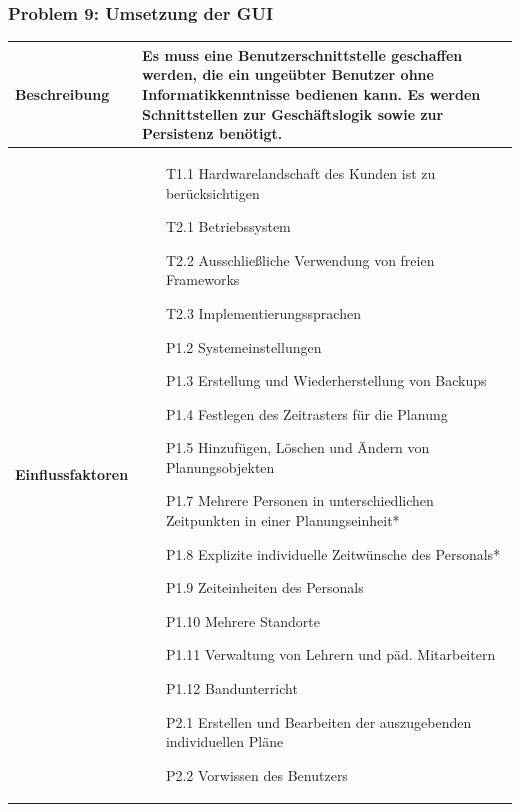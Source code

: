\documentclass[fontsize=12pt,paper=a4,twoside]{scrartcl}
\begin{document}
\subsubsection{Problem 9: Umsetzung der GUI}
\begin{tabularx}{\textwidth}{|p{6cm}|X|}
 \hline
 \textbf{Beschreibung} & 
Es muss eine Benutzerschnittstelle geschaffen werden, die ein ungeübter Benutzer ohne Informatikkenntnisse bedienen kann. Es werden Schnittstellen zur Geschäftslogik sowie zur Persistenz benötigt. \\\hline
 \textbf{Einflussfaktoren} &
 \begin{itemize}[topsep = 0pt]
\item[T1.1] Hardwarelandschaft des Kunden ist zu berücksichtigen
\item[T2.1] Betriebssystem
\item[T2.2] Ausschließliche Verwendung von freien Frameworks
\item[T2.3] Implementierungssprachen
\item[P1.2] Systemeinstellungen
\item[P1.3] Erstellung und Wiederherstellung von Backups
\item[P1.4] Festlegen des Zeitrasters für die Planung
\item[P1.5] Hinzufügen, Löschen und Ändern von Planungsobjekten
\item[P1.7] Mehrere Personen in unterschiedlichen Zeitpunkten in einer Planungseinheit*
\item[P1.8] Explizite individuelle Zeitwünsche des Personals*
\item[P1.9] Zeiteinheiten des Personals
\item[P1.10] Mehrere Standorte
\item[P1.11] Verwaltung von Lehrern und päd. Mitarbeitern
\item[P1.12] Bandunterricht
\item[P2.1] Erstellen und Bearbeiten der auszugebenden individuellen Pläne
\item[P2.2] Vorwissen des Benutzers
 \end{itemize}\\\hline
\end{tabularx}

\newpage
\end{document}
